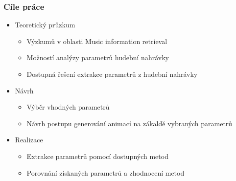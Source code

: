 \documentclass[%
  12pt,       				%
	t,                  %
	aspectratio=1610,   %
	unicode,						%
]{beamer}				    	%
\begin{document}
\disablenavigationsymbols

\maketitle

\begin{frame} 


	\frametitle{Cíle práce}
	\begin{itemize}
			\item Teoretický průzkum	
				\begin{itemize}
					\item Výzkumů v oblasti Music information retrieval
					\item Možností analýzy parametrů hudební nahrávky
					\item Dostupná řešení extrakce parametrů z hudební nahrávky
				\end{itemize}
			\item Návrh
				\begin{itemize}
					\item Výběr vhodných parametrů
					\item Návrh postupu generování animací na zákaldě vybraných parametrů
				\end{itemize}
			\item Realizace
				\begin{itemize}
					\item Extrakce parametrů pomocí dostupných metod
					\item Porovnání získaných parametrů a zhodnocení metod
				\end{itemize}
	\end{itemize}
\end{frame}
\end{document}
